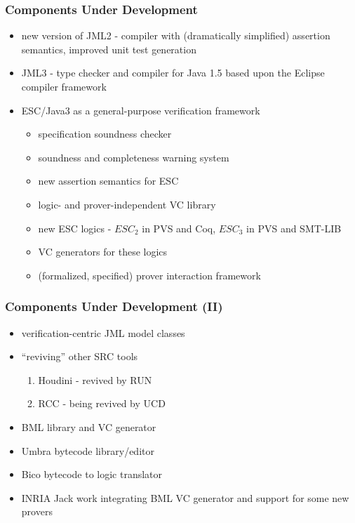 \documentclass{beamer}
\begin{document}
\begin{frame}\frametitle{Components Under Development}
  \begin{itemize}
  \item new version of JML2 - compiler with (dramatically
    simplified) assertion semantics, improved unit test generation
  \item JML3 - type checker and compiler for Java 1.5 based upon the
    Eclipse compiler framework
  \item ESC/Java3 as a general-purpose verification framework
    \begin{itemize}
    \item specification soundness checker
    \item soundness and completeness warning system
    \item new assertion semantics for ESC
    \item logic- and prover-independent VC library
    \item new ESC logics - $ESC_2$ in PVS and Coq, $ESC_3$ in PVS and SMT-LIB
    \item VC generators for these logics
    \item (formalized, specified) prover interaction framework
    \end{itemize}
  \end{itemize}
\end{frame}

\begin{frame}\frametitle{Components Under Development (II)}
  \begin{itemize}
  \item verification-centric JML model classes
  \item ``reviving'' other SRC tools
    \begin{enumerate}
    \item Houdini - revived by RUN
    \item RCC - being revived by UCD
    \end{enumerate}
  \item BML library and VC generator
  \item Umbra bytecode library/editor
  \item Bico bytecode to logic translator
  \item INRIA Jack work integrating BML VC generator and support for
    some new provers
  \end{itemize}
\end{frame}
\end{document}
